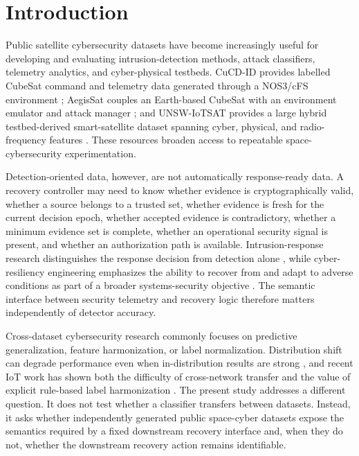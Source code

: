 \documentclass[preprint,12pt]{elsarticle}
\begin{document}
\section{Introduction}

Public satellite cybersecurity datasets have become increasingly useful for developing and evaluating intrusion-detection methods, attack classifiers, telemetry analytics, and cyber-physical testbeds. CuCD-ID provides labelled CubeSat command and telemetry data generated through a NOS3/cFS environment \cite{fayyaz2026cucd}; AegisSat couples an Earth-based CubeSat with an environment emulator and attack manager \cite{idan2025aegissat}; and UNSW-IoTSAT provides a large hybrid testbed-derived smart-satellite dataset spanning cyber, physical, and radio-frequency features \cite{abdelhameed2026unsw}. These resources broaden access to repeatable space-cybersecurity experimentation.

Detection-oriented data, however, are not automatically response-ready data. A recovery controller may need to know whether evidence is cryptographically valid, whether a source belongs to a trusted set, whether evidence is fresh for the current decision epoch, whether accepted evidence is contradictory, whether a minimum evidence set is complete, whether an operational security signal is present, and whether an authorization path is available. Intrusion-response research distinguishes the response decision from detection alone \cite{bashendy2023irs}, while cyber-resiliency engineering emphasizes the ability to recover from and adapt to adverse conditions as part of a broader systems-security objective \cite{ross2021cyberresilient}. The semantic interface between security telemetry and recovery logic therefore matters independently of detector accuracy.

Cross-dataset cybersecurity research commonly focuses on predictive generalization, feature harmonization, or label normalization. Distribution shift can degrade performance even when in-distribution results are strong \cite{koh2021wilds}, and recent IoT work has shown both the difficulty of cross-network transfer \cite{cerasuolo2026transfer} and the value of explicit rule-based label harmonization \cite{rodriguez2026harmonization}. The present study addresses a different question. It does not test whether a classifier transfers between datasets. Instead, it asks whether independently generated public space-cyber datasets expose the semantics required by a fixed downstream recovery interface and, when they do not, whether the downstream recovery action remains identifiable.
\end{document}
